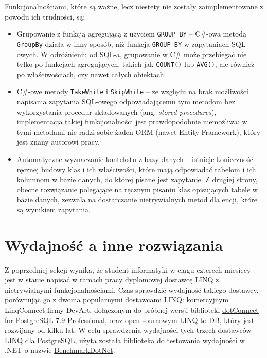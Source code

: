 Funkcjonalnościami, które są ważne, lecz niestety nie zostały zaimplementowane z powodu ich trudności, są:

\begin{itemize}
\item Grupowanie z funkcją agregującą z użyciem \texttt{GROUP BY} – C\#-owa metoda \texttt{GroupBy} działa w inny sposób, niż funkcja \texttt{GROUP BY} w zapytaniach SQL-owych. W odróżnieniu od SQL-a, grupowanie w C\# może przebiegać nie tylko po funkcjach agregujących, takich jak \texttt{COUNT()} lub \texttt{AVG()}, ale również po właściwościach, czy nawet całych obiektach.
\item C\#-owe metody \href{https://msdn.microsoft.com/pl-pl/library/bb534804(v=vs.110).aspx}{\texttt{TakeWhile}} i \href{https://www.google.pl/url?sa=t&rct=j&q=&esrc=s&source=web&cd=1&cad=rja&uact=8&ved=0ahUKEwj43ai66LPUAhVCVhQKHSm4BfkQFggnMAA&url=https%3A%2F%2Fmsdn.microsoft.com%2Fpl-pl%2Flibrary%2Fbb549075(v%3Dvs.110).aspx&usg=AFQjCNHEbD9WVhCdEeCDPQw0CIt845i9Kg&sig2=41OZNQAxqA1IYG9QzuzK1g}{\texttt{SkipWhile}} – ze względu na brak możliwości napisania zapytania SQL-owego odpowiadającemu tym metodom bez wykorzystania procedur składowanych (ang. \textit{stored procedures}), implementacja takiej funkcjonalności jest prawdopodobnie niemożliwa; w tymi metodami nie radzi sobie żaden ORM (nawet Entity Framework), który jest znany autorowi pracy.
\item Automatyczne wyznaczanie kontekstu z bazy danych – istnieje konieczność ręcznej budowy klas i ich właściwości, które mają odpowiadać tabelom i ich kolumnom w bazie danych, do której pisane jest zapytanie. Z drugiej strony, obecne rozwiązanie polegające na ręcznym pisaniu klas opisujących tabele w bazie danych, zezwala na dostarczanie nietrywialnych metod dla encji, które są wynikiem zapytania.
\end{itemize}

\newpage

\section{Wydajność a inne rozwiązania}
Z poprzedniej sekcji wynika, że student informatyki w ciągu czterech miesięcy jest w stanie napisać w ramach pracy dyplomowej dostawcę LINQ z nietrywialnymi funkcjonalnościami. Czas sprawdzić wydajność takiego dostawcy, porównując go z dwoma popularnymi dostawcami LINQ: komercyjnym LinqConnect firmy DevArt, dołączonym do próbnej wersji biblioteki \href{https://www.devart.com/dotconnect/postgresql/}{dotConnect for PostgreSQL 7.9 Professional}, oraz open-sourcowym \href{https://github.com/linq2db/linq2db}{LINQ to DB}, który jest rozwijany od kilku lat. W celu sprawdzenia wydajności tych trzech dostawców LINQ dla PostgreSQL, użyta została biblioteka do testowania wydajności w .NET o nazwie \href{https://github.com/dotnet/BenchmarkDotNet}{BenchmarkDotNet}.

